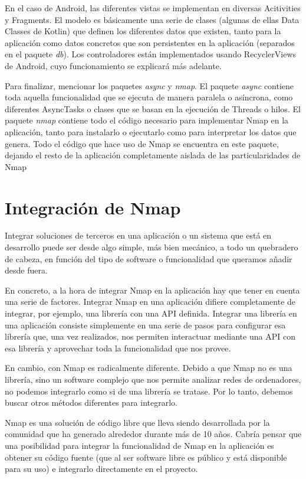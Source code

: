 En el caso de Android, las diferentes vistas se implementan en diversas Acitivities y Fragments. El modelo es básicamente una serie de clases (algunas de ellas Data Classes de Kotlin) que definen los diferentes datos que existen, tanto para la aplicación como datos concretos que son persistentes en la aplicación (separados en el paquete \textit{db}). Los controladores están implementados usando RecyclerViews de Android, cuyo funcionamiento se explicará más adelante.

Para finalizar, mencionar los paquetes \textit{async} y \textit{nmap}. El paquete \textit{async} contiene toda aquella funcionalidad que se ejecuta de manera paralela o asíncrona, como diferentes AsyncTasks o clases que se basan en la ejecución de Threads o hilos. El paquete \textit{nmap} contiene todo el código necesario para implementar Nmap en la aplicación, tanto para instalarlo o ejecutarlo como para interpretar los datos que genera. Todo el código que hace uso de Nmap se encuentra en este paquete, dejando el resto de la aplicación completamente aislada de las particularidades de Nmap

\section{Integración de Nmap}

Integrar soluciones de terceros en una aplicación o un sistema que está en desarrollo puede ser desde algo simple, más bien mecánico, a todo un quebradero de cabeza, en función del tipo de software o funcionalidad que queramos añadir desde fuera.

En concreto, a la hora de integrar Nmap en la aplicación hay que tener en cuenta una serie de factores. Integrar Nmap en una aplicación difiere completamente de integrar, por ejemplo, una librería con una API definida. Integrar una librería en una aplicación consiste simplemente en una serie de pasos para configurar esa librería que, una vez realizados, nos permiten interactuar mediante una API con esa librería y aprovechar toda la funcionalidad que nos provee. 

En cambio, con Nmap es radicalmente diferente. Debido a que Nmap no es una librería, sino un software complejo que nos permite analizar redes de ordenadores, no podemos integrarlo como si de una librería se tratase. Por lo tanto, debemos buscar otros métodos diferentes para integrarlo.

Nmap es una solución de código libre que lleva siendo desarrollada por la comunidad que ha generado alrededor durante más de 10 años. Cabría pensar que una posibilidad para integrar la funcionalidad de Nmap en la aplicación es obtener su código fuente (que al ser software libre es público y está disponible para su uso) e integrarlo directamente en el proyecto.

